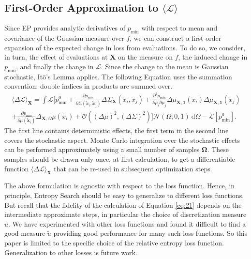 \documentclass[twoside,11pt]{article}
\renewcommand{\L}{\mathcal{L}}
\newcommand{\N}{\mathcal{N}}
\renewcommand{\d}{\:\mathrm{d}}
\newcommand{\de}{\partial}
\newcommand{\vx}{\vec{x}}
\newcommand{\vX}{\vec{X}}
\newcommand{\pmin}{p_{\min}}
\renewcommand{\vec}{\boldsymbol}
\renewcommand{\O}{\mathcal{O}}
\begin{document}
\subsection{First-Order Approximation to $\langle \L\rangle $}
\label{sec:first-order-appr}

Since EP provides analytic derivatives of $\pmin$ with respect to mean
and covariance of the Gaussian measure over $f$, we can construct a
first order expansion of the expected change in loss from
evaluations. To do so, we consider, in turn, the effect of evaluations
at $\vX$ on the measure on $f$, the induced change in $\pmin$, and
finally the change in $\L$. Since the change to the mean is Gaussian
stochastic, It{\=o}'s Lemma \citep{ito1951stochastic} applies. The
following Equation uses the summation convention: double indices in
products are summed over.
\begin{multline}
  \label{eq:21}
  \langle \Delta\L \rangle_{\vX} = \int \L\bigg[\pmin ^0 + \frac{\de
    \pmin}{\de \Sigma(\tilde{x}_i,\tilde{x}_j)} \Delta\Sigma_{\vX}
  (\tilde{x}_i,\tilde{x}_j) + \frac{\de^2 \pmin}{\de \mu_i \de \mu_j}
  \Delta\mu_{\vX,\vec{1}}(\tilde{x}_i)\Delta\mu_{\vX,\vec{1}}(\tilde{x}_j)\\
  + \frac{\de \pmin}{\de \mu(\tilde{\vx}_i)}
  \Delta_{\vX,\Omega}\mu(\tilde{x}_i) +
  \O((\Delta\mu)^2,(\Delta\Sigma)^2) \bigg] \N(\Omega;0,1) \d \Omega -
  \L[\pmin^0].
\end{multline}
The first line contains deterministic effects, the first term in the
second line covers the stochastic aspect. Monte Carlo integration over
the stochastic effects can be performed approximately using a small
number of samples $\vec\Omega$. These samples should be drawn only
once, at first calculation, to get a differentiable function
$\langle\Delta\L\rangle_{\vX}$ that can be re-used in subsequent
optimization steps.

The above formulation is agnostic with respect to the loss
function. Hence, in principle, Entropy Search should be easy to
generalize to different loss functions. But recall that the fidelity
of the calculation of Equation \eqref{eq:21} depends on the
intermediate approximate steps, in particular the choice of
discretization measure $\tilde{u}$. We have experimented with other
loss functions and found it difficult to find a good measure
$\tilde{u}$ providing good performance for many such loss
functions. So this paper is limited to the specific choice of the
relative entropy loss function. Generalization to other losses is
future work.
\end{document}
